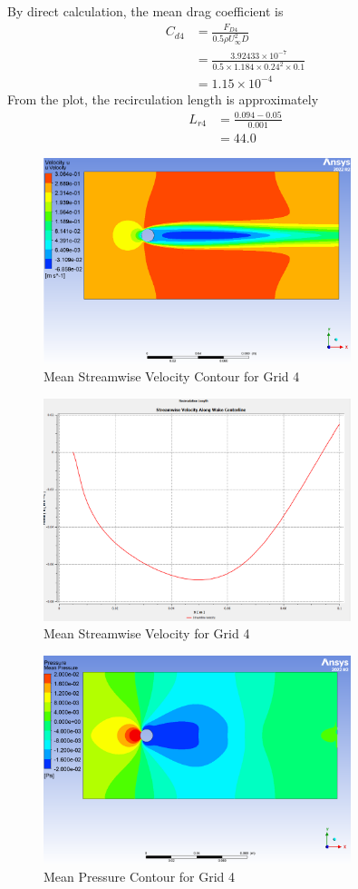 By direct calculation, the mean drag coefficient is
\begin{align*}
    C_{d4} &= \frac{F_{D4}}{0.5\rho U_\infty^2 D} \\
    &= \frac{3.92433 \times 10^{-7}}{0.5 \times 1.184 \times 0.24^2 \times 0.1} \\
    &= 1.15 \times 10^{-4}
\end{align*}
From the plot, the recirculation length is approximately
\begin{align*}
    L_{r4} &= \frac{0.094 - 0.05}{0.001} \\
    &=\boxed{44.0}
\end{align*}
\begin{figure}[H]
    \centering
    \includegraphics[width=0.8\textwidth]{Questions/Figures/u velocity contour grid 4.png}
    \caption{Mean Streamwise Velocity Contour for Grid 4}
\end{figure}
\begin{figure}[H]
    \centering
    \includegraphics[width=0.8\textwidth]{Questions/Figures/plot with grid 4.png}
    \caption{Mean Streamwise Velocity for Grid 4}
\end{figure}
\begin{figure}[H]
    \centering
    \includegraphics[width=0.8\textwidth]{Questions/Figures/mean pressure grid 4.png}
    \caption{Mean Pressure Contour for Grid 4}
\end{figure}